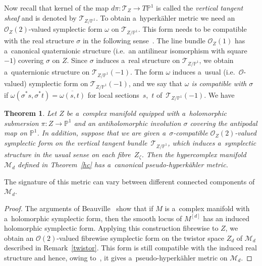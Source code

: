 \documentclass[pdftex]{sigma}
\numberwithin{equation}{section}
\newtheorem{Theorem}{Theorem}[section]
\begin{document}
Now recall that kernel of the map $d\pi:{\mathcal{T}}_Z\to T{\mathbb{P}}^1$ is called the {\em vertical tangent sheaf}
and is denoted by ${\mathcal{T}}_{Z/{\mathbb{P}}^1}$.
To obtain a~hyperk\"ahler metric we need an ${\mathcal{O}}_Z(2)$-valued symplectic form $\omega$ on
${\mathcal{T}}_{Z/{\mathbb{P}}^1}$.
This form needs to be compatible with the real structure $\sigma$ in the following sense~\cite{HKLR}.
The line bundle ${\mathcal{O}}_Z(1)$ has a~canonical quaternionic structure (i.e.\
an antilinear isomorphism with square $-1$) covering $\sigma$ on $Z$.
Since $\sigma$ induces a~real structure on ${\mathcal{T}}_{Z/{\mathbb{P}}^1}$, we obtain a~quaternionic structure on
${\mathcal{T}}_{Z/{\mathbb{P}}^1}(-1)$.
The form $\omega$ induces a~usual (i.e.\
${\mathcal{O}}$-valued) symplectic form on ${\mathcal{T}}_{Z/{\mathbb{P}}^1}(-1)$, and we say that {\em $\omega$ is
compatible with $\sigma$} if $\omega(\sigma^\ast s,\sigma^\ast t)=\overline{\omega(s,t)}$ for local sections~$s$,~$t$ of~${\mathcal{T}}_{Z/{\mathbb{P}}^1}(-1)$.
We have
\begin{Theorem}
Let $Z$ be a~complex manifold equipped with a~holomorphic submersion \mbox{$\pi:Z{\to} {\mathbb{P}}^1$} and an antiholomorphic
involution $\sigma$ covering the antipodal map on ${\mathbb{P}}^1$.
In addition, suppose that we are given a~$\sigma$-compatible ${\mathcal{O}}_Z(2)$-valued symplectic form on the vertical
tangent bundle~${\mathcal{T}}_{Z/{\mathbb{P}}^1}$, which induces a~symplectic structure in the usual sense on each fibre~$Z_\zeta$.
Then the hypercomplex manifold ${\mathcal{M}}_d$ defined in Theorem~{\rm \ref{hc}} has a~canonical pseudo-hyperk\"ahler
metric.
\end{Theorem}

\begin{Remark}
The signature of this metric can vary between dif\/ferent connected components of ${\mathcal{M}}_d$.
\end{Remark}
\begin{proof}
The arguments of Beauville~\cite{Beau} show that if $M$ is a~complex manifold with a~holomorphic symplectic form, then
the smooth locus of $M^{[d]}$ has an induced holomorphic symplectic form.
Applying this construction f\/ibrewise to $Z$, we obtain an ${\mathcal{O}}(2)$-valued f\/ibrewise symplectic form on the
twistor space $Z_d$ of ${\mathcal{M}}_d$ described in Remark~\ref{twistor}.
This form is still compatible with the induced real structure and hence, owing to~\cite[Theorem 3.3]{HKLR}, it gives
a~pseudo-hyperk\"ahler metric on ${\mathcal{M}}_d$.
\end{proof}
\end{document}
